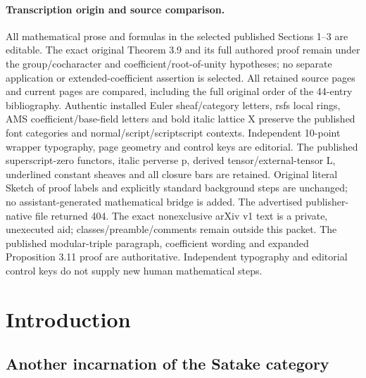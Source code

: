 \documentclass[10pt]{article}
\theoremstyle{remark}
\numberwithin{equation}{section}
\begin{document}
\paragraph{Transcription origin and source comparison.} All mathematical prose and formulas in the selected published Sections 1--3 are editable. The exact original Theorem 3.9 and its full authored proof remain under the group/cocharacter and coefficient/root-of-unity hypotheses; no separate application or extended-coefficient assertion is selected. All retained source pages and current pages are compared, including the full original order of the 44-entry bibliography. Authentic installed Euler sheaf/category letters, rsfs local rings, AMS coefficient/base-field letters and bold italic lattice X preserve the published font categories and normal/script/scriptscript contexts. Independent 10-point wrapper typography, page geometry and control keys are editorial. The published superscript-zero functors, italic perverse p, derived tensor/external-tensor L, underlined constant sheaves and all closure bars are retained. Original literal Sketch of proof labels and explicitly standard background steps are unchanged; no assistant-generated mathematical bridge is added. The advertised publisher-native file returned 404. The exact nonexclusive arXiv v1 text is a private, unexecuted aid; classes/preamble/comments remain outside this packet. The published modular-triple paragraph, coefficient wording and expanded Proposition 3.11 proof are authoritative. Independent typography and editorial control keys do not supply new human mathematical steps.
\clearpage
\section{Introduction}

\subsection{Another incarnation of the Satake category}
\end{document}
